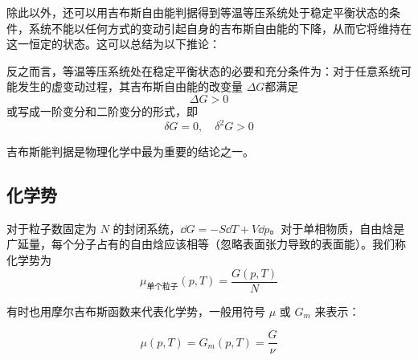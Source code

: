 除此以外，还可以用吉布斯自由能判据得到等温等压系统处于稳定平衡状态的条件，系统不能以任何方式的变动引起自身的吉布斯自由能的下降，从而它将维持在这一恒定的状态。这可以总结为以下推论：

\begin{corollary}{}
反之而言，等温等压系统处在稳定平衡状态的必要和充分条件为：对于任意系统可能发生的虚变动过程，其吉布斯自由能的改变量 $\Delta G$都满足
\begin{equation}
\Delta G>0
\end{equation}
或写成一阶变分和二阶变分的形式，即
\begin{equation}\label{eq_GibbsG_2}
\delta G=0,\quad \delta^2 G>0
\end{equation}
\end{corollary}

吉布斯能判据是物理化学中最为重要的结论之一。


\subsection{化学势}

对于粒子数固定为 $N$ 的封闭系统，$\dd G=-S\dd T+V\dd p$。对于单相物质，自由焓是广延量，每个分子占有的自由焓应该相等（忽略表面张力导致的表面能）。我们称化学势为
\begin{equation}
\mu_{\text{单个粒子}}(p,T)=\frac{G(p,T)}{N}
\end{equation}

有时也用摩尔吉布斯函数来代表化学势，一般用符号 $\mu$ 或 $G_m$ 来表示：

\begin{equation}\label{eq_GibbsG_1}
\mu(p,T)=G_m(p,T)=\frac{G}{\nu}
\end{equation}

